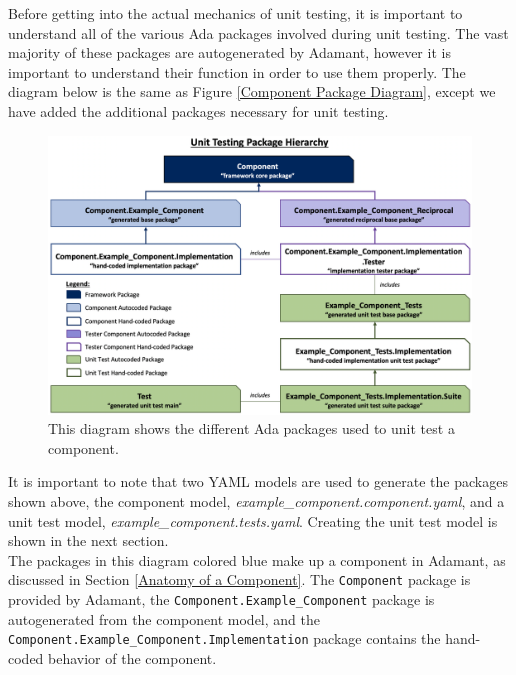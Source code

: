Before getting into the actual mechanics of unit testing, it is important to understand all of the various Ada packages involved during unit testing. The vast majority of these packages are autogenerated by Adamant, however it is important to understand their function in order to use them properly. The diagram below is the same as Figure \ref{Component Package Diagram}, except we have added the additional packages necessary for unit testing.

\vspace{5mm} %
\begin{figure}[H]
  \includegraphics[width=1.00\textwidth,center]{images/testerpackages.png}
  \caption{This diagram shows the different Ada packages used to unit test a component.}
\end{figure}
\vspace{5mm} %

It is important to note that two YAML models are used to generate the packages shown above, the component model, \textit{example\_component.component.yaml}, and a unit test model, \textit{example\_component.tests.yaml}. Creating the unit test model is shown in the next section. \\

The packages in this diagram colored blue make up a component in Adamant, as discussed in Section \ref{Anatomy of a Component}. The \texttt{Component} package is provided by Adamant, the \texttt{Component.Example\_Component} package is autogenerated from the component model, and the \texttt{Component.Example\_Component.Implementation} package contains the hand-coded behavior of the component. \\

